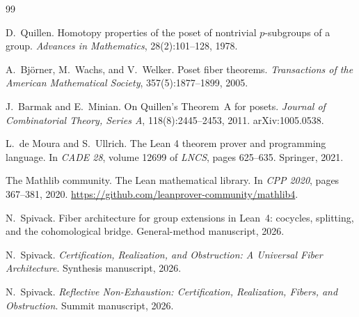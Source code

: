 \documentclass[11pt]{article}
\begin{document}
\begin{thebibliography}{99}

D.~Quillen.
\newblock Homotopy properties of the poset of nontrivial $p$-subgroups of a
  group.
\newblock \emph{Advances in Mathematics}, 28(2):101--128, 1978.

A.~Bj\"orner, M.~Wachs, and V.~Welker.
\newblock Poset fiber theorems.
\newblock \emph{Transactions of the American Mathematical Society},
  357(5):1877--1899, 2005.

J.~Barmak and E.~Minian.
\newblock On Quillen's Theorem~A for posets.
\newblock \emph{Journal of Combinatorial Theory, Series A}, 118(8):2445--2453,
  2011.
\newblock arXiv:1005.0538.

L.~de Moura and S.~Ullrich.
\newblock The Lean 4 theorem prover and programming language.
\newblock In \emph{CADE 28}, volume 12699 of \emph{LNCS}, pages 625--635.
  Springer, 2021.

The Mathlib community.
\newblock The Lean mathematical library.
\newblock In \emph{CPP 2020}, pages 367--381, 2020.
\newblock \url{https://github.com/leanprover-community/mathlib4}.

N.~Spivack.
\newblock Fiber architecture for group extensions in Lean~4: cocycles,
  splitting, and the cohomological bridge.
\newblock General-method manuscript, 2026.

N.~Spivack.
\newblock \emph{Certification, Realization, and Obstruction: A Universal Fiber Architecture}.
\newblock Synthesis manuscript, 2026.

N.~Spivack.
\newblock \emph{Reflective Non-Exhaustion: Certification, Realization, Fibers, and Obstruction}.
\newblock Summit manuscript, 2026.

\end{thebibliography}
\end{document}
